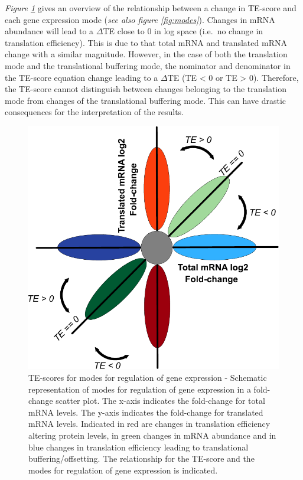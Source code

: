 \documentclass[12pt,openany]{book}
\begin{document}
\emph{Figure \ref{fig:TE}} gives an overview of the relationship between
a change in TE-score and each gene expression mode (\emph{see also
figure \ref{fig:modes}}). Changes in mRNA abundance will lead to a
\(\varDelta\)TE close to 0 in log space (i.e.~no change in translation
efficiency). This is due to that total mRNA and translated mRNA change
with a similar magnitude. However, in the case of both the translation
mode and the translational buffering mode, the nominator and denominator
in the TE-score equation change leading to a \(\varDelta\)TE (TE
\textless{} 0 or TE \textgreater{} 0). Therefore, the TE-score cannot
distinguish between changes belonging to the translation mode from
changes of the translational buffering mode. This can have drastic
consequences for the interpretation of the results. \clearpage

\begin{figure}
  \includegraphics{./figures/geneModes_TE.pdf}
  \caption{TE-scores for modes for regulation of gene expression -  Schematic representation of modes for regulation of gene expression in a fold-change scatter plot. The x-axis indicates the fold-change for total mRNA levels. The y-axis indicates the fold-change for translated mRNA levels. Indicated in red are changes in translation efficiency altering protein levels, in green changes in mRNA abundance and in blue changes in translation efficiency leading to translational buffering/offsetting. The relationship for the TE-score and the modes for regulation of gene expression is indicated. \label{fig:TE}}
\end{figure}
\end{document}
